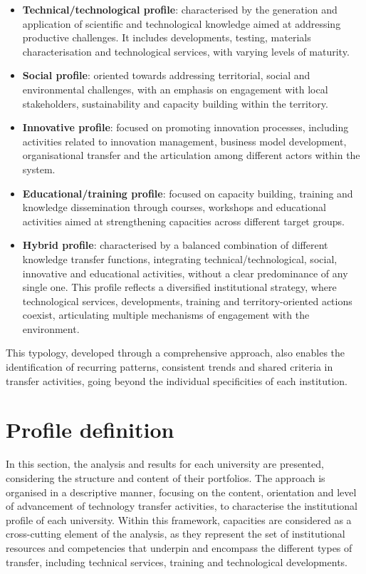 \documentclass[
  12pt,
  oneside]{book}
\providecommand{\tightlist}{%
  \setlength{\itemsep}{0pt}\setlength{\parskip}{0pt}}
\begin{document}
\begin{itemize}
\tightlist
\item
  \textbf{Technical/technological profile}: characterised by the
  generation and application of scientific and technological knowledge
  aimed at addressing productive challenges. It includes developments,
  testing, materials characterisation and technological services, with
  varying levels of maturity.
\item
  \textbf{Social profile}: oriented towards addressing territorial,
  social and environmental challenges, with an emphasis on engagement
  with local stakeholders, sustainability and capacity building within
  the territory.
\item
  \textbf{Innovative profile}: focused on promoting innovation
  processes, including activities related to innovation management,
  business model development, organisational transfer and the
  articulation among different actors within the system.
\item
  \textbf{Educational/training profile}: focused on capacity building,
  training and knowledge dissemination through courses, workshops and
  educational activities aimed at strengthening capacities across
  different target groups.
\item
  \textbf{Hybrid profile}: characterised by a balanced combination of
  different knowledge transfer functions, integrating
  technical/technological, social, innovative and educational
  activities, without a clear predominance of any single one. This
  profile reflects a diversified institutional strategy, where
  technological services, developments, training and territory-oriented
  actions coexist, articulating multiple mechanisms of engagement with
  the environment.
\end{itemize}

This typology, developed through a comprehensive approach, also enables
the identification of recurring patterns, consistent trends and shared
criteria in transfer activities, going beyond the individual
specificities of each institution.

\section{Profile definition}\label{profile-definition}

In this section, the analysis and results for each university are
presented, considering the structure and content of their portfolios.
The approach is organised in a descriptive manner, focusing on the
content, orientation and level of advancement of technology transfer
activities, to characterise the institutional profile of each
university. Within this framework, capacities are considered as a
cross-cutting element of the analysis, as they represent the set of
institutional resources and competencies that underpin and encompass the
different types of transfer, including technical services, training and
technological developments.
\end{document}
